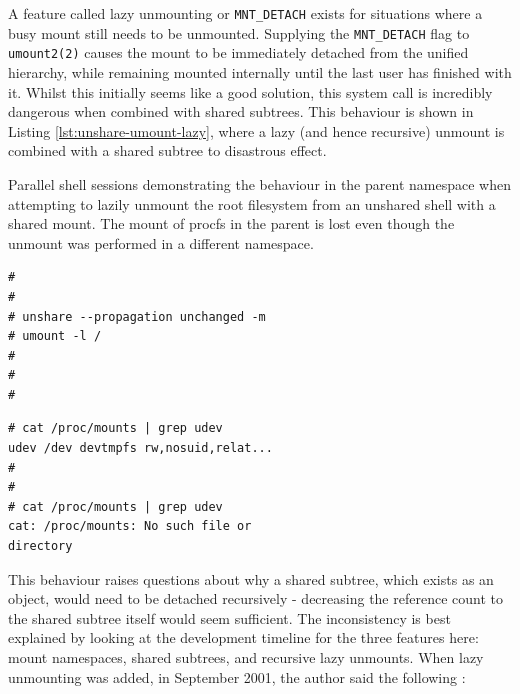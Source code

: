 \documentclass[12pt,a4paper,twoside]{report}
\begin{document}
A feature called lazy unmounting or \texttt{MNT\_DETACH} exists for situations where a busy mount still needs to be unmounted. Supplying the \texttt{MNT\_DETACH} flag to \texttt{umount2(2)} causes the mount to be immediately detached from the unified hierarchy, while remaining mounted internally until the last user has finished with it. Whilst this initially seems like a good solution, this system call is incredibly dangerous when combined with shared subtrees. This behaviour is shown in Listing \ref{lst:unshare-umount-lazy}, where a lazy (and hence recursive) unmount is combined with a shared subtree to disastrous effect.

\begin{listing}
\label{lst:unshare-umount-lazy}
\caption{Parallel shell sessions demonstrating the behaviour in the parent namespace when attempting to lazily unmount the root filesystem from an unshared shell with a shared mount. The mount of procfs in the parent is lost even though the unmount was performed in a different namespace.}

\begin{minipage}{.49\textwidth}

\begin{verbatim}
#
#
# unshare --propagation unchanged -m
# umount -l /
#
#
#
\end{verbatim}

\end{minipage}
\hfill
\begin{minipage}{.49\textwidth}

\begin{verbatim}
# cat /proc/mounts | grep udev
udev /dev devtmpfs rw,nosuid,relat...
#
#
# cat /proc/mounts | grep udev
cat: /proc/mounts: No such file or
directory
\end{verbatim}

\end{minipage}
\end{listing}

This behaviour raises questions about why a shared subtree, which exists as an object, would need to be detached recursively - decreasing the reference count to the shared subtree itself would seem sufficient. The inconsistency is best explained by looking at the development timeline for the three features here: mount namespaces, shared subtrees, and recursive lazy unmounts. When lazy unmounting was added, in September 2001, the author said the following \citep{viro_patch_2001}:

\end{document}
